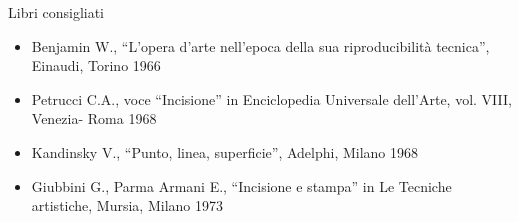 \documentclass[hidelinks,aspectratio=169]{beamer}
\begin{document}
\begin{frame}{Libri consigliati}
		\begin{itemize}
			\item \tiny{Benjamin W., “L’opera d’arte nell’epoca della sua riproducibilità tecnica”, Einaudi, Torino 1966}
			\item \tiny{Petrucci C.A., voce “Incisione” in Enciclopedia Universale dell’Arte, vol. VIII, Venezia- Roma 1968}
			\item \tiny{Kandinsky V., “Punto, linea, superficie”, Adelphi, Milano 1968}
			\item \tiny{Giubbini G., Parma Armani E., “Incisione e stampa” in Le Tecniche artistiche, Mursia, Milano 1973}
		\end{itemize}
	\end{frame}
	
\end{document}
